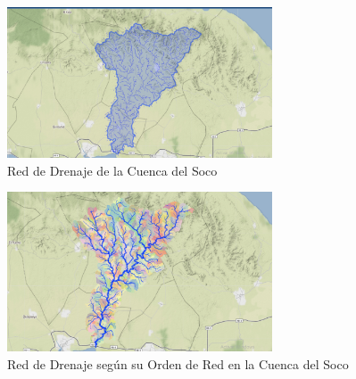 \documentclass[11pt,]{article}
\begin{document}
\begin{figure}
\centering
\includegraphics[width=0.70000\textwidth]{denaje.png}
\caption{Red de Drenaje de la Cuenca del Soco\label{mapanueve}}
\end{figure}

\begin{figure}
\centering
\includegraphics[width=0.70000\textwidth]{drenaje segun orden.png}
\caption{Red de Drenaje según su Orden de Red en la Cuenca del
Soco\label{mapadiez}}
\end{figure}
\end{document}
